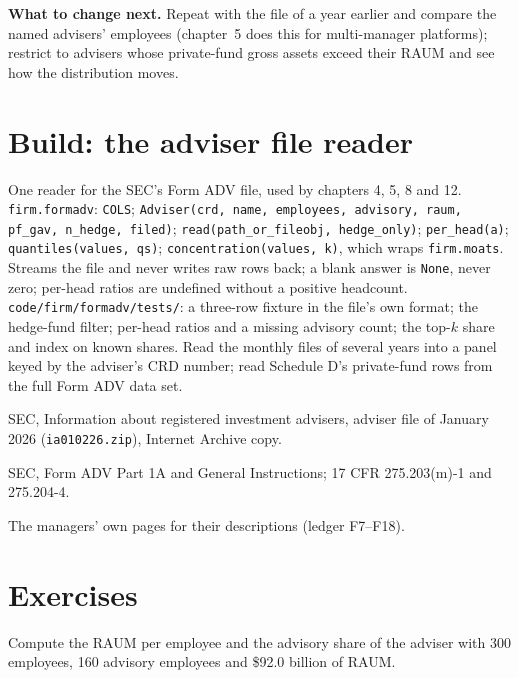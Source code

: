 \textbf{What to change next.} Repeat with the file of a year earlier and compare the named advisers' employees
(chapter~5 does this for multi-manager platforms); restrict to advisers whose private-fund gross assets exceed their
RAUM and see how the distribution moves.

\section{Build: the adviser file reader}\label{bld:in:quantitative-hedge-funds-and-systematic-managers:formadv}

\begin{build}
 One reader for the SEC's Form ADV file, used by chapters 4, 5, 8 and 12.
 \texttt{firm.formadv}: \texttt{COLS}; \texttt{Adviser(crd, name, employees, advisory, raum, pf\_gav,
n\_hedge, filed)}; \texttt{read(path\_or\_fileobj, hedge\_only)}; \texttt{per\_head(a)}; \texttt{quantiles(values,
qs)}; \texttt{concentration(values, k)}, which wraps \texttt{firm.moats}.
 Streams the file and never writes raw rows back; a blank answer is \texttt{None}, never zero; per-head
ratios are undefined without a positive headcount.
 \texttt{code/firm/formadv/tests/}: a three-row fixture in the file's own format; the hedge-fund
filter; per-head ratios and a missing advisory count; the top-$k$ share and index on known shares.
 Read the monthly files of several years into a panel keyed by the adviser's CRD number; read Schedule
D's private-fund rows from the full Form ADV data set.
\end{build}

\begin{omsources}
\item SEC, Information about registered investment advisers, adviser file of January 2026 (\texttt{ia010226.zip}),
Internet Archive copy.
\item SEC, Form ADV Part 1A and General Instructions; 17 CFR 275.203(m)-1 and 275.204-4.
\item The managers' own pages for their descriptions (ledger F7--F18).
\end{omsources}

\section{Exercises}

\begin{exercise}[$\star$]\label{exo:in:quantitative-hedge-funds-and-systematic-managers:1}
Compute the RAUM per employee and the advisory share of the adviser with 300 employees, 160 advisory employees and
\$92.0 billion of RAUM.
\end{exercise}

